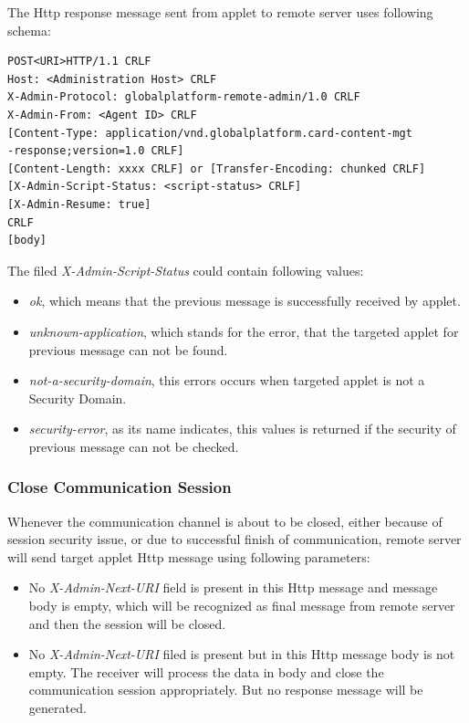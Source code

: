 The Http response message sent from applet to remote server uses following schema\cite{gp}:
\begin{Verbatim}[fontsize=\relsize{-1}, frame=lines,framesep=4mm, label=\fbox{\small\emph{Http Response Schema}}]
POST<URI>HTTP/1.1 CRLF
Host: <Administration Host> CRLF
X-Admin-Protocol: globalplatform-remote-admin/1.0 CRLF
X-Admin-From: <Agent ID> CRLF
[Content-Type: application/vnd.globalplatform.card-content-mgt
-response;version=1.0 CRLF]
[Content-Length: xxxx CRLF] or [Transfer-Encoding: chunked CRLF]
[X-Admin-Script-Status: <script-status> CRLF]
[X-Admin-Resume: true]
CRLF
[body]
\end{Verbatim}

The filed \emph{X-Admin-Script-Status} could contain following values:
 \begin{itemize}
  \item \emph{ok}, which means that the previous message is successfully received by applet.
  \item \emph{unknown-application}, which stands for the error, that the targeted applet for previous message can not be found.
\item \emph{not-a-security-domain}, this errors occurs when targeted applet is not a Security Domain.
\item \emph{security-error}, as its name indicates, this values is returned if the security of previous message  can not be checked.
\end{itemize}

\subsubsection{Close Communication Session}
Whenever the communication channel is about to be closed, either because of session security issue, or due to successful finish of communication, remote server will send target applet Http message using following parameters:
 \begin{itemize}
  \item No \emph{X-Admin-Next-URI} field is present in this Http message and message body is empty, which will be recognized as final message from remote server and then the session will be closed.
  \item No \emph{X-Admin-Next-URI} filed is present but in this Http message body is not empty. The receiver will process the data in body and close the communication session appropriately. But no response message will be generated.
\end{itemize}


